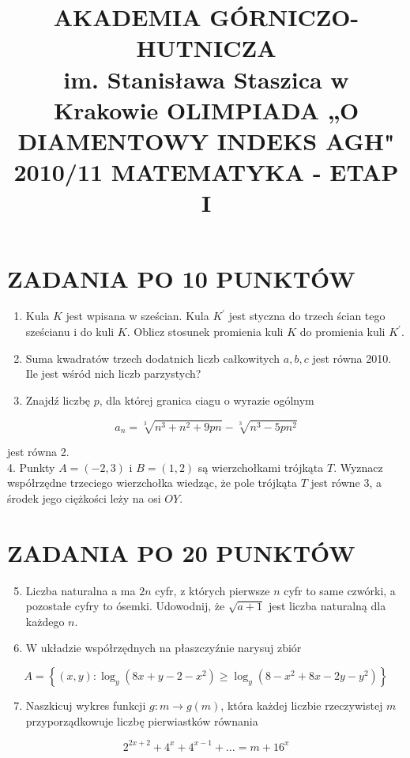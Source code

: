 \documentclass[10pt]{article}
\title{AKADEMIA GÓRNICZO-HUTNICZA \\
 im. Stanisława Staszica w Krakowie OLIMPIADA „O DIAMENTOWY INDEKS AGH" 2010/11 MATEMATYKA - ETAP I }
\author{}
\date{}
\begin{document}
\maketitle
\section*{ZADANIA PO 10 PUNKTÓW}
\begin{enumerate}
  \item Kula $K$ jest wpisana w sześcian. Kula $K^{\prime}$ jest styczna do trzech ścian tego sześcianu i do kuli $K$. Oblicz stosunek promienia kuli $K$ do promienia kuli $K^{\prime}$.
  \item Suma kwadratów trzech dodatnich liczb całkowitych $a, b, c$ jest równa 2010. Ile jest wśród nich liczb parzystych?
  \item Znajdź liczbę $p$, dla której granica ciagu o wyrazie ogólnym
\end{enumerate}

$$
a_{n}=\sqrt[3]{n^{3}+n^{2}+9 p n}-\sqrt[3]{n^{3}-5 p n^{2}}
$$

jest równa 2.\\
4. Punkty $A=(-2,3)$ i $B=(1,2)$ są wierzchołkami trójkąta $T$. Wyznacz współrzędne trzeciego wierzchołka wiedząc, że pole trójkąta $T$ jest równe 3, a środek jego ciężkości leży na osi $O Y$.

\section*{ZADANIA PO 20 PUNKTÓW}
\begin{enumerate}
  \setcounter{enumi}{4}
  \item Liczba naturalna a ma $2 n$ cyfr, z których pierwsze $n$ cyfr to same czwórki, a pozostałe cyfry to ósemki. Udowodnij, że $\sqrt{a+1}$ jest liczba naturalną dla każdego $n$.
  \item W układzie współrzędnych na płaszczyźnie narysuj zbiór
\end{enumerate}

$$
A=\left\{(x, y): \log _{y}\left(8 x+y-2-x^{2}\right) \geq \log _{y}\left(8-x^{2}+8 x-2 y-y^{2}\right)\right\}
$$

\begin{enumerate}
  \setcounter{enumi}{6}
  \item Naszkicuj wykres funkcji $g: m \rightarrow g(m)$, która każdej liczbie rzeczywistej $m$ przyporządkowuje liczbę pierwiastków równania
\end{enumerate}

$$
2^{2 x+2}+4^{x}+4^{x-1}+\ldots=m+16^{x}
$$
\end{document}
